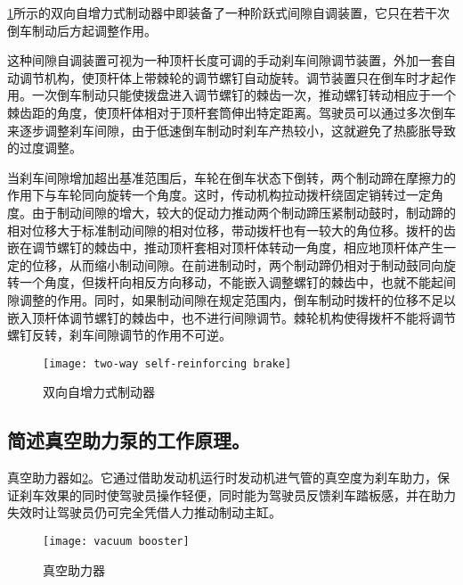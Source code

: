 \documentclass[UTF8]{ctexart}
\numberwithin{figure}{section}
\numberwithin{table}{section}
\begin{document}
\cref{two-way self-reinforcing brake}所示的双向自增力式制动器中即装备了一种阶跃式间隙自调装置，它只在若干次倒车制动后方起调整作用。

这种间隙自调装置可视为一种顶杆长度可调的手动刹车间隙调节装置，外加一套自动调节机构，使顶杆体上带棘轮的调节螺钉自动旋转。调节装置只在倒车时才起作用。一次倒车制动只能使拨盘进入调节螺钉的棘齿一次，推动螺钉转动相应于一个棘齿距的角度，使顶杆体相对于顶杆套筒伸出特定距离。驾驶员可以通过多次倒车来逐步调整刹车间隙，由于低速倒车制动时刹车产热较小，这就避免了热膨胀导致的过度调整。

当刹车间隙增加超出基准范围后，车轮在倒车状态下倒转，两个制动蹄在摩擦力的作用下与车轮同向旋转一个角度。这时，传动机构拉动拨杆绕固定销转过一定角度。由于制动间隙的增大，较大的促动力推动两个制动蹄压紧制动鼓时，制动蹄的相对位移大于标准制动间隙的相对位移，带动拨杆也有一较大的角位移。拨杆的齿嵌在调节螺钉的棘齿中，推动顶杆套相对顶杆体转动一角度，相应地顶杆体产生一定的位移，从而缩小制动间隙。在前进制动时，两个制动蹄仍相对于制动鼓同向旋转一个角度，但拨杆向相反方向移动，不能嵌入调整螺钉的棘齿中，也就不能起间隙调整的作用。同时，如果制动间隙在规定范围内，倒车制动时拨杆的位移不足以嵌入顶杆体调节螺钉的棘齿中，也不进行间隙调节。棘轮机构使得拨杆不能将调节螺钉反转，刹车间隙调节的作用不可逆。

\begin{figure}[htbp]
	\centering
	\begin{minipage}[b]{0.6\textwidth}
		\centering
		\texttt{[image: two-way self-reinforcing brake]}
		\caption{双向自增力式制动器}
		\label{two-way self-reinforcing brake}
	\end{minipage}
\end{figure}

\subsection{简述真空助力泵的工作原理。}

真空助力器如\cref{vacuum booster}。它通过借助发动机运行时发动机进气管的真空度为刹车助力，保证刹车效果的同时使驾驶员操作轻便，同时能为驾驶员反馈刹车踏板感，并在助力失效时让驾驶员仍可完全凭借人力推动制动主缸。

\begin{figure}[htbp]
	\centering
	\begin{minipage}[b]{0.4\textwidth}
		\centering
		\texttt{[image: vacuum booster]}
		\caption{真空助力器}
		\label{vacuum booster}
	\end{minipage}
\end{figure}
\end{document}
